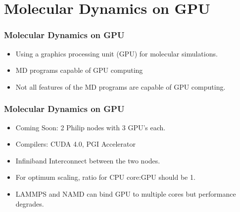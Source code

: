 \documentclass[slidestop,mathserif,compress,xcolor=svgnames]{beamer}
\begin{document}
\section{Molecular Dynamics on GPU}
\begin{frame}
\frametitle{\small Molecular Dynamics on GPU}
\begin{itemize}
\item Using a graphics processing unit (GPU) for molecular simulations.
\item MD programs capable of GPU computing
\item Not all features of the MD programs are capable of GPU computing.
\end{itemize}
\end{frame}

\begin{frame}
\frametitle{\small Molecular Dynamics on GPU}
\begin{itemize}
\item Coming Soon: 2  Philip nodes with 3  GPU's each.
\item Compilers: CUDA 4.0, PGI Accelerator
\item Infiniband Interconnect between the two nodes.
\item For optimum scaling, ratio for CPU core:GPU should be 1. 
\item LAMMPS and NAMD can bind  GPU to multiple cores but performance degrades.
\end{itemize}
\end{frame}
\end{document}

